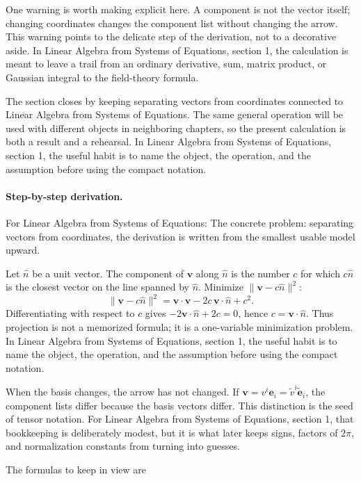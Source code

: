 One warning is worth making explicit here.  A component is not the vector itself; changing coordinates changes the component list without changing the arrow.  This warning points to the delicate step of the derivation, not to a decorative aside.  In Linear Algebra from Systems of Equations, section 1, the calculation is meant to leave a trail from an ordinary derivative, sum, matrix product, or Gaussian integral to the field-theory formula.

The section closes by keeping separating vectors from coordinates connected to Linear Algebra from Systems of Equations.  The same general operation will be used with different objects in neighboring chapters, so the present calculation is both a result and a rehearsal.  In Linear Algebra from Systems of Equations, section 1, the useful habit is to name the object, the operation, and the assumption before using the compact notation.



\paragraph{Step-by-step derivation.}

For Linear Algebra from Systems of Equations: The concrete problem: separating vectors from coordinates, the derivation is written from the smallest usable model upward.

Let \(\hat n\) be a unit vector.  The component of \(\bm v\) along \(\hat n\) is the number \(c\) for which \(c\hat n\) is the closest vector on the line spanned by \(\hat n\).  Minimize \(\|\bm v-c\hat n\|^2\):
\[
  \|\bm v-c\hat n\|^2=\bm v\cdot\bm v-2c\,\bm v\cdot\hat n+c^2.
\]
Differentiating with respect to \(c\) gives \(-2\bm v\cdot\hat n+2c=0\), hence \(c=\bm v\cdot\hat n\).  Thus projection is not a memorized formula; it is a one-variable minimization problem.  In Linear Algebra from Systems of Equations, section 1, the useful habit is to name the object, the operation, and the assumption before using the compact notation.

When the basis changes, the arrow has not changed.  If \(\bm v=v^i\bm e_i=\tilde v^i\tilde{\bm e}_i\), the component lists differ because the basis vectors differ.  This distinction is the seed of tensor notation.  For Linear Algebra from Systems of Equations, section 1, that bookkeeping is deliberately modest, but it is what later keeps signs, factors of \(2\pi\), and normalization constants from turning into guesses.

The formulas to keep in view are

